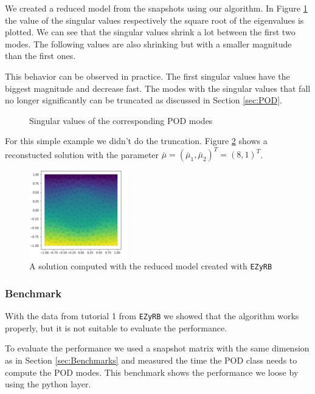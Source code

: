 We created a reduced model from the snapshots using our algorithm.
In Figure \ref{fig:Singularvals} the value of the singular values respectively the square root of the eigenvalues is plotted.
We can see that the singular values shrink a lot between the first two modes. The following values are also shrinking but with a smaller magnitude than the first ones.

This behavior can be observed in practice. The first singular values have the biggest magnitude and decrease fast. The  modes with the singular values that fall no longer significantly can be truncated as discussed in Section \ref{sec:POD}. 

\begin{figure}[H]
	\centering
	
	\caption[Singular values]{Singular values of the corresponding POD modes}
	\label{fig:Singularvals}
\end{figure}

For this simple example we didn't do the truncation.
Figure \ref{fig:reconstruct} shows a reconstucted solution with the parameter $ \bar{\mu} = (\bar{\mu}_1 , \bar{\mu}_2 )^T = ( 8 , 1 )^T $.
\begin{figure}[H]
	\centering
	\includegraphics[width=0.38\textwidth]{images/reconstruct}
	\caption[Reduced Solution]{A solution computed with the reduced model created with \texttt{EZyRB}}
	\label{fig:reconstruct}
\end{figure}

\subsubsection{Benchmark}
With the data from tutorial 1 from \texttt{EZyRB} \cite{demo18ezyrb} we showed that the algorithm works properly, but it is not suitable to evaluate the performance.

To evaluate the performance we used a snapshot matrix with the same dimension as in Section \ref{sec:Benchmarks} and measured the time the POD class needs to compute the POD modes. This benchmark shows the performance we loose by using the python layer.

